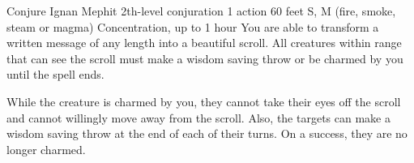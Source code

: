 \documentclass{article}
\begin{document}
\DndSpellHeader%
  {Conjure Ignan Mephit}
  {2th-level conjuration}
  {1 action}
  {60 feet}
  {S, M (fire, smoke, steam or magma)}
  {Concentration, up to 1 hour}
You are able to transform a written message of any length into a beautiful scroll. All creatures within range that can see the scroll must make a wisdom saving throw or be charmed by you until the spell ends.

While the creature is charmed by you, they cannot take their eyes off the scroll and cannot willingly move away from the scroll. Also, the targets can make a wisdom saving throw at the end of each of their turns. On a success, they are no longer charmed.
\end{document}
